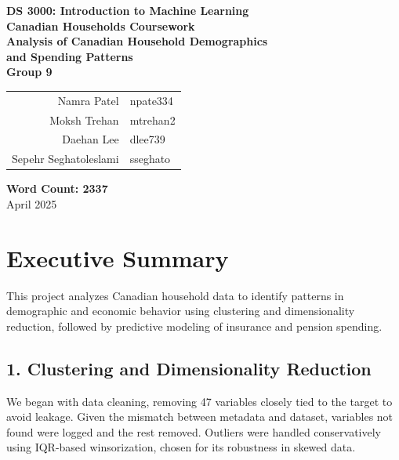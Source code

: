 \documentclass{article}
\begin{document}
\begin{titlepage}
    \centering
    \vspace*{2.5cm}
    
    {\LARGE \textbf{DS 3000: Introduction to Machine Learning}}\\[0.5cm]
    {\Large \textbf{Canadian Households Coursework}}\\[1.5cm]
    
    {\Huge \textbf{Analysis of Canadian Household Demographics\\ and Spending Patterns}}\\[2cm]

    {\large \textbf{Group 9}}\\[0.8cm]
    \begin{tabular}{rl}
        Namra Patel & \hspace{1cm} npate334 \\
        Moksh Trehan & \hspace{1cm} mtrehan2 \\
        Daehan Lee & \hspace{1cm} dlee739 \\
        Sepehr Seghatoleslami & \hspace{1cm} sseghato \\
    \end{tabular}
    
    \vfill
    {\large \textbf{Word Count: 2337}}\\[1.5cm]    
    {\large April 2025}
\end{titlepage}


\tableofcontents
\newpage	

\section{Executive Summary}

This project analyzes Canadian household data to identify patterns in demographic and economic behavior using clustering and dimensionality reduction, followed by predictive modeling of insurance and pension spending.

\subsection*{1. Clustering and Dimensionality Reduction}

We began with data cleaning, removing 47 variables closely tied to the target to avoid leakage. Given the mismatch between metadata and dataset, variables not found were logged and the rest removed. Outliers were handled conservatively using IQR-based winsorization, chosen for its robustness in skewed data.
\end{document}
